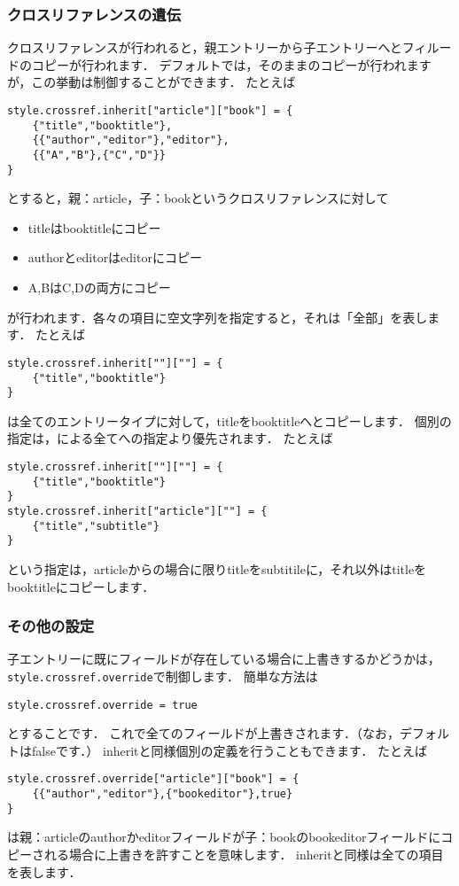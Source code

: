 \documentclass[a4paper,lualatex]{jlreq}
\makeatletter
\def\luastring{\@ifstar{\luastring@s}{\luastring@}}
\newcommand*{\luastring@s}[1]{``\texttt{#1}''}
\newcommand*{\luavar}[1]{\texttt{#1}}
\makeatother
\begin{document}
\subsubsection{クロスリファレンスの遺伝}
クロスリファレンスが行われると，親エントリーから子エントリーへとフィルードのコピーが行われます．
デフォルトでは，そのままのコピーが行われますが，この挙動は制御することができます．
たとえば
\begin{lstlisting}
style.crossref.inherit["article"]["book"] = {
    {"title","booktitle"},
    {{"author","editor"},"editor"},
    {{"A","B"},{"C","D"}}
}
\end{lstlisting}
とすると，親：article，子：bookというクロスリファレンスに対して
\begin{itemize}
\item titleはbooktitleにコピー
\item authorとeditorはeditorにコピー
\item A,BはC,Dの両方にコピー
\end{itemize}
が行われます．各々の項目に空文字列\luastring{}を指定すると，それは「全部」を表します．
たとえば
\begin{lstlisting}
style.crossref.inherit[""][""] = {
    {"title","booktitle"}
}
\end{lstlisting}
は全てのエントリータイプに対して，titleをbooktitleへとコピーします．
個別の指定は，\luastring{}による全てへの指定より優先されます．
たとえば
\begin{lstlisting}
style.crossref.inherit[""][""] = {
    {"title","booktitle"}
}
style.crossref.inherit["article"][""] = {
    {"title","subtitle"}
}
\end{lstlisting}
という指定は，articleからの場合に限りtitleをsubtitileに，それ以外はtitleをbooktitleにコピーします．

\subsubsection{その他の設定}
子エントリーに既にフィールドが存在している場合に上書きするかどうかは，\luavar{style.crossref.override}で制御します．
簡単な方法は
\begin{lstlisting}
style.crossref.override = true
\end{lstlisting}
とすることです．
これで全てのフィールドが上書きされます．（なお，デフォルトはfalseです．）
inheritと同様個別の定義を行うこともできます．
たとえば
\begin{lstlisting}
style.crossref.override["article"]["book"] = {
    {{"author","editor"},{"bookeditor"},true}
}
\end{lstlisting}
は親：articleのauthorかeditorフィールドが子：bookのbookeditorフィールドにコピーされる場合に上書きを許すことを意味します．
inheritと同様\luastring{}は全ての項目を表します．
\end{document}
